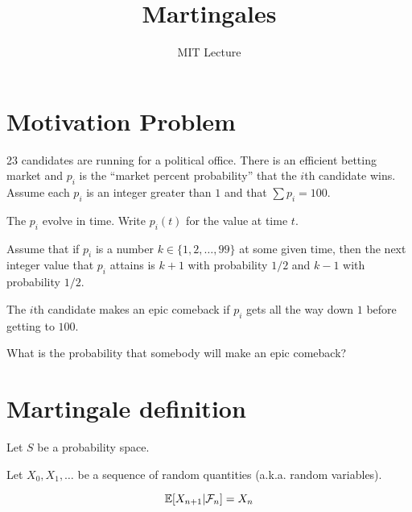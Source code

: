 \documentclass[10pt,a4paper]{article}
\title{Martingales}
\author{MIT Lecture}
\begin{document}
	\zeustitle

	\section{Motivation Problem}

	\begin{prob}
		23 candidates are running for a political office. There is an efficient betting market and $p_i$ is the ``market percent probability'' that the $i$th candidate wins. Assume each $p_i$ is an integer greater than $1$ and that $\sum p_i = 100$.

		The $p_i$ evolve in time. Write $p_i(t)$ for the value at time $t$.

		Assume that if $p_i$ is a number $k \in \{1, 2, \dots, 99\}$ at some given time, then the next integer value that $p_i$ attains is $k+1$ with probability $1/2$ and $k-1$ with probability $1/2$.

		The $i$th candidate makes an epic comeback if $p_i$ gets all the way down $1$ before getting to $100$.

		What is the probability that somebody will make an epic comeback?
	\end{prob}

	\section{Martingale definition}

		Let $S$ be a probability space.

		Let $X_0, X_1, \dots$ be a sequence of random quantities (a.k.a. random variables).

		\begin{defn}
			$$\mathbb{E}[X_{n+1}| \mathcal{F}_n] = X_n$$
		\end{defn}
\end{document}
